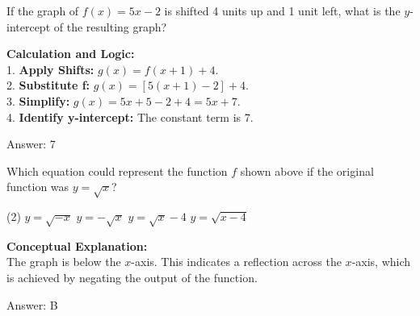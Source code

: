 \documentclass[11pt,paper=a4,answers]{exam}
\begin{document}
\begin{questions}
\question
If the graph of $f(x) = 5x - 2$ is shifted 4 units up and 1 unit left, what is the $y$-intercept of the resulting graph?

\begin{solution}
\textbf{Calculation and Logic:} \\
1. \textbf{Apply Shifts:} $g(x) = f(x+1) + 4$. \\
2. \textbf{Substitute f:} $g(x) = [5(x+1) - 2] + 4$. \\
3. \textbf{Simplify:} $g(x) = 5x + 5 - 2 + 4 = 5x + 7$. \\
4. \textbf{Identify y-intercept:} The constant term is 7.

\vspace{25pt}

Answer: \colorbox{yellow!100}{7}
\end{solution}

\vspace{40pt}

\question
\begin{center}
\end{center}
Which equation could represent the function $f$ shown above if the original function was $y = \sqrt{x}$?
\begin{tasks}(2)
    \task $y = \sqrt{-x}$
    \task $y = -\sqrt{x}$
    \task $y = \sqrt{x} - 4$
    \task $y = \sqrt{x-4}$
\end{tasks}

\begin{solution}
\textbf{Conceptual Explanation:} \\
The graph is below the $x$-axis. This indicates a reflection across the $x$-axis, which is achieved by negating the output of the function.

\vspace{25pt}

Answer: \colorbox{yellow!100}{B}
\end{solution}

\vspace{40pt}


\end{questions}
\end{document}
